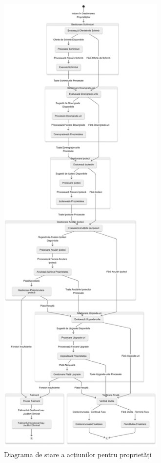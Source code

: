 \begin{figure}[H]
    \centering
    \includegraphics[height=24cm]{images/turn_state_diagram_property_actions.png}
    \caption{Diagrama de stare a acțiunilor pentru proprietăți}
    \label{fig:turn_state_diagram_overviewl}
\end{figure}